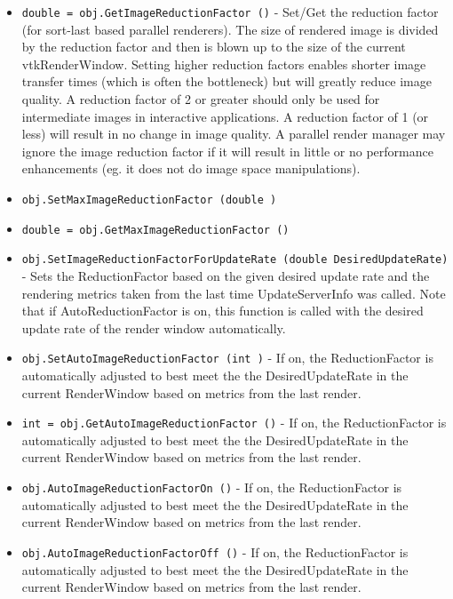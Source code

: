 \begin{itemize}
\item  \verb|double = obj.GetImageReductionFactor ()| -  Set/Get the reduction factor (for sort-last based parallel renderers).
 The size of rendered image is divided by the reduction factor and then
 is blown up to the size of the current vtkRenderWindow.  Setting
 higher reduction factors enables shorter image transfer times (which
 is often the bottleneck) but will greatly reduce image quality.  A
 reduction factor of 2 or greater should only be used for intermediate
 images in interactive applications.  A reduction factor of 1 (or less)
 will result in no change in image quality.  A parallel render manager
 may ignore the image reduction factor if it will result in little or
 no performance enhancements (eg. it does not do image space
 manipulations).

\item  \verb|obj.SetMaxImageReductionFactor (double )|

\item  \verb|double = obj.GetMaxImageReductionFactor ()|

\item  \verb|obj.SetImageReductionFactorForUpdateRate (double DesiredUpdateRate)| -  Sets the ReductionFactor based on the given desired update rate and
 the rendering metrics taken from the last time UpdateServerInfo was
 called.  Note that if AutoReductionFactor is on, this function is called
 with the desired update rate of the render window automatically.

\item  \verb|obj.SetAutoImageReductionFactor (int )| -  If on, the ReductionFactor is automatically adjusted to best meet the
 the DesiredUpdateRate in the current RenderWindow based on metrics
 from the last render.

\item  \verb|int = obj.GetAutoImageReductionFactor ()| -  If on, the ReductionFactor is automatically adjusted to best meet the
 the DesiredUpdateRate in the current RenderWindow based on metrics
 from the last render.

\item  \verb|obj.AutoImageReductionFactorOn ()| -  If on, the ReductionFactor is automatically adjusted to best meet the
 the DesiredUpdateRate in the current RenderWindow based on metrics
 from the last render.

\item  \verb|obj.AutoImageReductionFactorOff ()| -  If on, the ReductionFactor is automatically adjusted to best meet the
 the DesiredUpdateRate in the current RenderWindow based on metrics
 from the last render.


\end{itemize}
